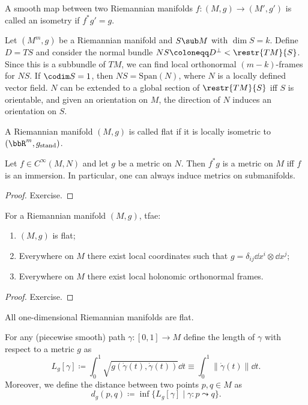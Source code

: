 \begin{defn}[Isometry]
A smooth map between two Riemannian manifolds $f:(M,g)\to(M',g')$ is called an isometry if $f^\ast g'=g$.
\end{defn}

\begin{cor}
Let $(M^m,g)$ be a Riemannian manifold and $S\sub M$ with $\dim S=k$. Define $D=TS$ and consider the normal bundle $NS\coloneqq D^\perp<\restr{TM}{S}$. Since this is a subbundle of $TM$, we can find local orthonormal $(m-k)$-frames for $NS$. If $\codim S=1$, then $NS=\mathrm{Span}(N)$, where $N$ is a locally defined vector field. $N$ can be extended to a global section of $\restr{TM}{S}$ iff $S$ is orientable, and given an orientation on $M$, the direction of $N$ induces an orientation on $S$.
\end{cor}


\begin{defn}
A Riemannian manifold $(M,g)$ is called flat if it is locally isometric to $(\bbR^m,g_{\text{stand}})$.
\end{defn}


\begin{thm}
Let $f\in C^\infty(M,N)$ and let $g$ be a metric on $N$. Then $f^\ast g$ is a metric on $M$ iff $f$ is an immersion. In particular, one can always induce metrics on submanifolds.
\end{thm}
\begin{proof}
Exercise.
\end{proof}

\begin{thm}
For a Riemannian manifold $(M,g)$,  \gls{tfae}:
\begin{enumerate}
    \item $(M,g)$ is flat;
    \item Everywhere on $M$ there exist local coordinates such that $g=\delta_{ij} \dd x^i\otimes \dd x^j$;
    \item Everywhere on $M$ there exist local holonomic orthonormal frames.
\end{enumerate}
\end{thm}
\begin{proof}
Exercise.
\end{proof}
\begin{cor}
All one-dimensional Riemannian manifolds are flat.
\end{cor}


\begin{defn}
    For any (piecewise smooth) path $\gamma:[0,1]\to M$ define the length of $\gamma$ with respect to a metric $g$ as
    \[L_g[\gamma]\coloneqq \int_0^1 \sqrt{g(\dot\gamma(t),\dot\gamma(t))}\dd t \equiv \int_0^1 \lVert\dot\gamma(t)\rVert \dd t.\]
    Moreover, we define the distance between two points $p,q\in M$ as 
    \[d_g(p,q)\coloneqq \inf \{L_g[\gamma]\mid \gamma:p\leadsto q\}.\]
\end{defn}

